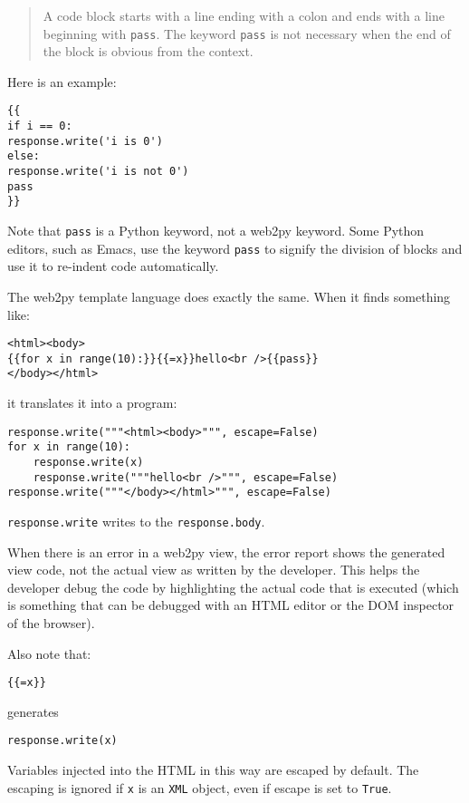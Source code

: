 \documentclass[justified,sixbynine,notoc]{tufte-book}
\def\ft{\small\tt}
\def\inxx#1{\index{#1}}
\begin{document}
\begin{fullwidth}
\begin{quote}A code block starts with a line ending with a colon and ends with a line beginning with {\ft pass}. The keyword {\ft pass} is not necessary when the end of the block is obvious from the context.\end{quote}
Here is an example:

\begin{lstlisting}[keywords={}]
{{
if i == 0:
response.write('i is 0')
else:
response.write('i is not 0')
pass
}}
\end{lstlisting}

Note that {\ft pass} is a Python keyword, not a web2py keyword. Some Python editors, such as Emacs, use the keyword {\ft pass} to signify the division of blocks and use it to re-indent code automatically.

The web2py template language does exactly the same. When it finds something like:

\begin{lstlisting}[keywords={}]
<html><body>
{{for x in range(10):}}{{=x}}hello<br />{{pass}}
</body></html>
\end{lstlisting}
\noindent it translates it into a program:
\begin{lstlisting}
response.write("""<html><body>""", escape=False)
for x in range(10):
    response.write(x)
    response.write("""hello<br />""", escape=False)
response.write("""</body></html>""", escape=False)
\end{lstlisting}
{\ft response.write} writes to the {\ft response.body}.

When there is an error in a web2py view, the error report shows the generated view code, not the actual view as written by the developer. This helps the developer debug the code by highlighting the actual code that is executed (which is something that can be debugged with an HTML editor or the DOM inspector of the browser).

Also note that:
\begin{lstlisting}[keywords={}]
{{=x}}
\end{lstlisting}
\noindent generates
\inxx{response.write} \inxx{escape}
\begin{lstlisting}
response.write(x)
\end{lstlisting}

Variables injected into the HTML in this way are escaped by default.
The escaping is ignored if {\ft x} is an {\ft XML} object, even if escape is set to {\ft True}.


\end{fullwidth}
\end{document}

